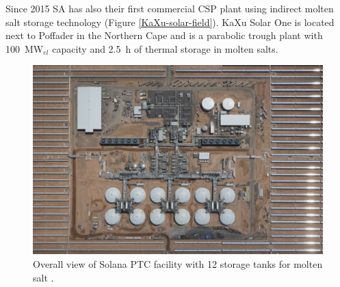 \documentclass[Master,MEE,english]{twbook}%
\begin{document}
Since 2015 SA has also their first commercial CSP plant using indirect molten salt storage technology (Figure \ref{KaXu-solar-field}). KaXu Solar One is located next to Poffader in the Northern Cape and is a parabolic trough plant with 100~MW$_{el}$ capacity and 2.5~h of thermal storage in molten salts. \cite{NREL2015c}
\begin{figure}[!bhtp]  
\centering
\includegraphics[width=0.9\linewidth]{FIG/SolanaStorage}
\caption[Overall view of Solana PTC facility with 12 storage tanks for molten salt.]{Overall view of Solana PTC facility with 12 storage tanks for molten salt \cite{AbengoaSolar2013}.}\label{SolanaStorage}
\end{figure}
\end{document}
